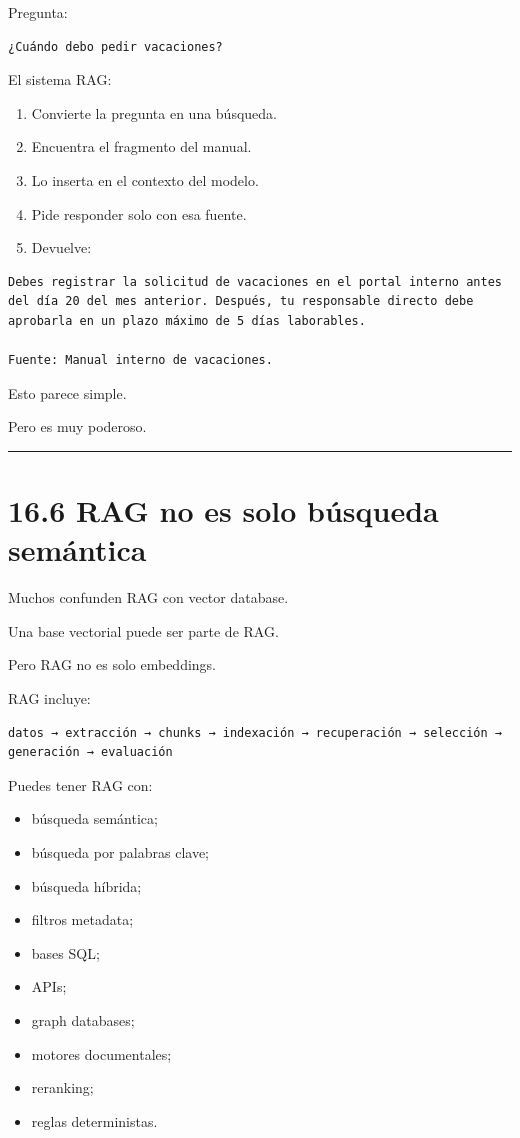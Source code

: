 Pregunta:

\begin{lstlisting}
¿Cuándo debo pedir vacaciones?
\end{lstlisting}

El sistema RAG:

\begin{enumerate}
\def\labelenumi{\arabic{enumi}.}
\tightlist
\item
  Convierte la pregunta en una búsqueda.
\item
  Encuentra el fragmento del manual.
\item
  Lo inserta en el contexto del modelo.
\item
  Pide responder solo con esa fuente.
\item
  Devuelve:
\end{enumerate}

\begin{lstlisting}
Debes registrar la solicitud de vacaciones en el portal interno antes del día 20 del mes anterior. Después, tu responsable directo debe aprobarla en un plazo máximo de 5 días laborables.

Fuente: Manual interno de vacaciones.
\end{lstlisting}

Esto parece simple.

Pero es muy poderoso.

\begin{center}\rule{0.5\linewidth}{0.5pt}\end{center}

\section{16.6 RAG no es solo búsqueda
semántica}\label{rag-no-es-solo-buxfasqueda-semuxe1ntica}

Muchos confunden RAG con vector database.

Una base vectorial puede ser parte de RAG.

Pero RAG no es solo embeddings.

RAG incluye:

\begin{lstlisting}
datos → extracción → chunks → indexación → recuperación → selección → generación → evaluación
\end{lstlisting}

Puedes tener RAG con:

\begin{itemize}
\tightlist
\item
  búsqueda semántica;
\item
  búsqueda por palabras clave;
\item
  búsqueda híbrida;
\item
  filtros metadata;
\item
  bases SQL;
\item
  APIs;
\item
  graph databases;
\item
  motores documentales;
\item
  reranking;
\item
  reglas deterministas.
\end{itemize}

